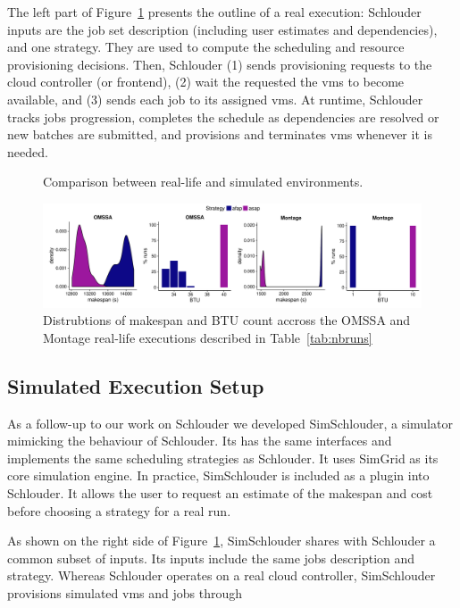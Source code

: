 \documentclass[10pt,conference,compsocconf]{IEEEtran}
\begin{document}
The left part  of Figure~\ref{fig:rs} presents the outline of  a real execution:
Schlouder inputs are the  job set description (including  user estimates and dependencies),  
and one strategy. They are used to compute   the   scheduling   and  resource   provisioning
decisions. Then, Schlouder (1) sends provisioning requests to the cloud controller (or frontend), 
(2) wait the requested the  \acp{vm} to become available, and (3) sends  each  job to  its
assigned \acp{vm}. At runtime, Schlouder tracks jobs progression, completes the schedule as
dependencies are  resolved or new batches are submitted, and provisions and terminates \acp{vm}
whenever it is needed.

\begin{figure}
	\resizebox{0.5\textwidth}{!}{%
		
		
	}%
	\caption{Comparison between real-life and simulated environments.}\label{fig:rs}
\end{figure}
\begin{figure}
	\centering
	\includegraphics[width=\textwidth]{gfx/real_plot.pdf}
	\caption{Distrubtions of makespan and BTU count accross the OMSSA and 
	  Montage real-life executions described in Table~\ref{tab:nbruns}}
	\label{fig:realbrs}
\end{figure}

\subsection{Simulated Execution Setup}
As a follow-up  to our work on Schlouder we  developed SimSchlouder, a simulator
mimicking  the  behaviour  of  Schlouder. Its has the same interfaces and implements  the  same  scheduling
strategies  as  Schlouder. It  uses  SimGrid  as its  core  simulation  engine.  In
practice, SimSchlouder  is included as  a plugin  into Schlouder. It allows the
user to request an estimate of the makespan and cost before choosing a
strategy for a real run.

As  shown on  the right  side of  Figure~\ref{fig:rs}, SimSchlouder  shares with
Schlouder  a common  subset of  inputs.   Its inputs  include the  same jobs
description  and  strategy.    Whereas  Schlouder  operates  on   a  real  cloud
controller,  SimSchlouder   provisions  simulated  \acp{vm}  and   jobs  through
\end{document}

